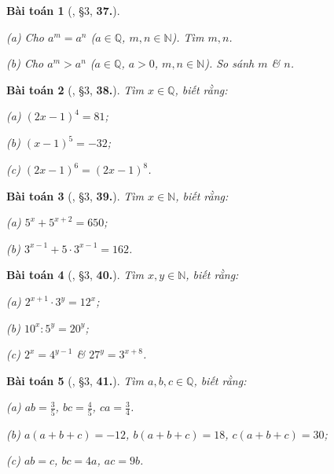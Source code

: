 \documentclass{article}
\numberwithin{equation}{section}
\newtheorem{baitoan}{Bài toán}[section]
\begin{document}
\begin{baitoan}[\cite{Binh_Toan_7_tap_1}, \S3, \textbf{37.}]
	\begin{enumerate*}
		\item[(a)] Cho $a^m = a^n$ ($a\in\mathbb{Q}$, $m,n\in\mathbb{N}$). Tìm $m,n$.
		\item[(b)] Cho $a^m > a^n$ ($a\in\mathbb{Q}$, $a > 0$, $m,n\in\mathbb{N}$). So sánh $m$ \& $n$.
	\end{enumerate*}
\end{baitoan}

\begin{baitoan}[\cite{Binh_Toan_7_tap_1}, \S3, \textbf{38.}]
	Tìm $x\in\mathbb{Q}$, biết rằng:
	\begin{enumerate*}
		\item[(a)] $(2x - 1)^4 = 81$;
		\item[(b)] $(x - 1)^5 = -32$;
		\item[(c)] $(2x - 1)^6 = (2x - 1)^8$.
	\end{enumerate*}
\end{baitoan}

\begin{baitoan}[\cite{Binh_Toan_7_tap_1}, \S3, \textbf{39.}]
	Tìm $x\in\mathbb{N}$, biết rằng:
	\begin{enumerate*}
		\item[(a)] $5^x + 5^{x+2} = 650$;
		\item[(b)] $3^{x-1} + 5\cdot 3^{x-1} = 162$.
	\end{enumerate*}
\end{baitoan}

\begin{baitoan}[\cite{Binh_Toan_7_tap_1}, \S3, \textbf{40.}]
	Tìm $x,y\in\mathbb{N}$, biết rằng:
	\begin{enumerate*}
		\item[(a)] $2^{x+1}\cdot 3^y = 12^x$;
		\item[(b)] $10^x:5^y = 20^y$;
		\item[(c)] $2^x = 4^{y-1}$ \& $27^y = 3^{x+8}$.
	\end{enumerate*}
\end{baitoan}

\begin{baitoan}[\cite{Binh_Toan_7_tap_1}, \S3, \textbf{41.}]
	Tìm $a,b,c\in\mathbb{Q}$, biết rằng:
	\begin{enumerate*}
		\item[(a)] $ab = \frac{3}{5}$, $bc = \frac{4}{5}$, $ca = \frac{3}{4}$.
		\item[(b)] $a(a + b + c) = -12$, $b(a + b + c) = 18$, $c(a + b + c) = 30$;
		\item[(c)] $ab = c$, $bc = 4a$, $ac = 9b$.
	\end{enumerate*}
\end{baitoan}
\end{document}
